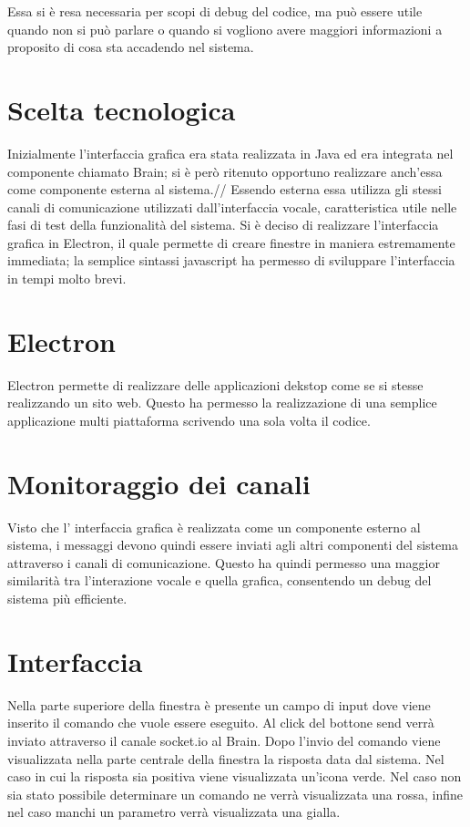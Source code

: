 \documentclass[twoside]{supsistudent}
\begin{document}
Essa si è resa necessaria per scopi di debug del codice, ma può essere utile quando non si può parlare o quando si vogliono avere maggiori informazioni a proposito di cosa sta accadendo nel sistema.
\section{Scelta tecnologica}
Inizialmente l'interfaccia grafica era stata realizzata in Java ed era integrata nel componente chiamato Brain; si è però ritenuto opportuno realizzare anch'essa come componente esterna al sistema.//
Essendo esterna essa utilizza gli stessi canali di comunicazione utilizzati dall'interfaccia vocale, caratteristica utile nelle fasi di test della funzionalità del sistema.
Si è deciso di realizzare l'interfaccia grafica in Electron, il quale permette di creare finestre in maniera estremamente immediata; la semplice sintassi javascript ha permesso di sviluppare l'interfaccia in tempi molto brevi. \cite{electron}
\section{Electron}
Electron permette di realizzare delle applicazioni dekstop come se si stesse realizzando un sito web. Questo ha permesso la realizzazione di una semplice applicazione multi piattaforma scrivendo una sola volta il codice.
\section{Monitoraggio dei canali}
Visto che l' interfaccia grafica è realizzata come un componente esterno al sistema, i messaggi devono quindi essere inviati agli altri componenti del sistema attraverso i canali di comunicazione. Questo ha quindi permesso una maggior similarità tra l'interazione vocale e quella grafica, consentendo un debug del sistema più efficiente.
\section{Interfaccia}
Nella parte superiore della finestra è presente un campo di input dove viene inserito il comando che vuole essere eseguito. Al click del bottone send verrà inviato attraverso il canale socket.io al Brain.
Dopo l'invio del comando viene visualizzata nella parte centrale della finestra la risposta data dal sistema.
Nel caso in cui la risposta sia positiva viene visualizzata un'icona verde. Nel caso non sia stato possibile determinare un comando ne verrà visualizzata una rossa, infine nel caso manchi un parametro verrà visualizzata una gialla.
\end{document}
